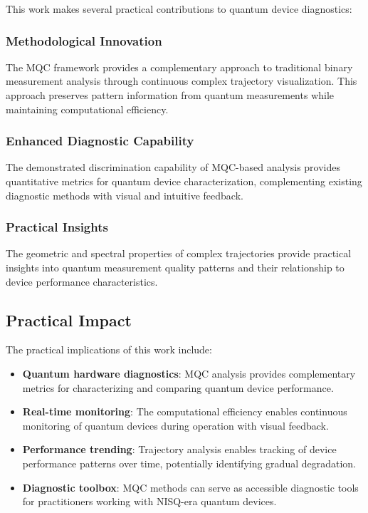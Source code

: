 This work makes several practical contributions to quantum device diagnostics:

\subsubsection{Methodological Innovation}
The MQC framework provides a complementary approach to traditional binary measurement analysis through continuous complex trajectory visualization. This approach preserves pattern information from quantum measurements while maintaining computational efficiency.

\subsubsection{Enhanced Diagnostic Capability}
The demonstrated discrimination capability of MQC-based analysis provides quantitative metrics for quantum device characterization, complementing existing diagnostic methods with visual and intuitive feedback.

\subsubsection{Practical Insights}
The geometric and spectral properties of complex trajectories provide practical insights into quantum measurement quality patterns and their relationship to device performance characteristics.

\subsection{Practical Impact}

The practical implications of this work include:

\begin{itemize}
\item \textbf{Quantum hardware diagnostics}: MQC analysis provides complementary metrics for characterizing and comparing quantum device performance.

\item \textbf{Real-time monitoring}: The computational efficiency enables continuous monitoring of quantum devices during operation with visual feedback.

\item \textbf{Performance trending}: Trajectory analysis enables tracking of device performance patterns over time, potentially identifying gradual degradation.

\item \textbf{Diagnostic toolbox}: MQC methods can serve as accessible diagnostic tools for practitioners working with NISQ-era quantum devices.
\end{itemize}

